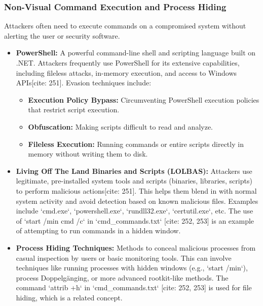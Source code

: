 \documentclass[11pt]{article}
\begin{document}
	\subsubsection{Non-Visual Command Execution and Process Hiding}
	Attackers often need to execute commands on a compromised system without alerting the user or security software.
	\begin{itemize}
		\item \textbf{PowerShell:} A powerful command-line shell and scripting language built on .NET. Attackers frequently use PowerShell for its extensive capabilities, including fileless attacks, in-memory execution, and access to Windows APIs[cite: 251]. Evasion techniques include:
		\begin{itemize}
			\item \textbf{Execution Policy Bypass:} Circumventing PowerShell execution policies that restrict script execution.
			\item \textbf{Obfuscation:} Making scripts difficult to read and analyze.
			\item \textbf{Fileless Execution:} Running commands or entire scripts directly in memory without writing them to disk.
		\end{itemize}
		\item \textbf{Living Off The Land Binaries and Scripts (LOLBAS):} Attackers use legitimate, pre-installed system tools and scripts (binaries, libraries, scripts) to perform malicious actions[cite: 251]. This helps them blend in with normal system activity and avoid detection based on known malicious files. Examples include `cmd.exe`, `powershell.exe`, `rundll32.exe`, `certutil.exe`, etc. The use of `start /min cmd /c` in `cmd\_commands.txt` [cite: 252, 253] is an example of attempting to run commands in a hidden window.
		\item \textbf{Process Hiding Techniques:} Methods to conceal malicious processes from casual inspection by users or basic monitoring tools. This can involve techniques like running processes with hidden windows (e.g., `start /min`), process Doppelgänging, or more advanced rootkit-like methods. The command `attrib +h` in `cmd\_commands.txt` [cite: 252, 253] is used for file hiding, which is a related concept.
	\end{itemize}
	
\end{document}
